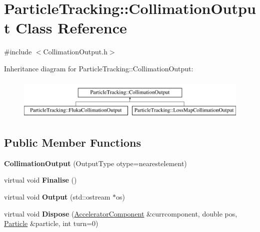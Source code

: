 \hypertarget{classParticleTracking_1_1CollimationOutput}{}\section{Particle\+Tracking\+:\+:Collimation\+Output Class Reference}
\label{classParticleTracking_1_1CollimationOutput}


{\ttfamily \#include $<$Collimation\+Output.\+h$>$}

Inheritance diagram for Particle\+Tracking\+:\+:Collimation\+Output\+:\begin{figure}[H]
\begin{center}
\leavevmode
\includegraphics[height=2.000000cm]{classParticleTracking_1_1CollimationOutput}
\end{center}
\end{figure}
\subsection*{Public Member Functions}
\begin{DoxyCompactItemize}
\item 
\mbox{\label{classParticleTracking_1_1CollimationOutput_a238ba78a99bc3b19b91b784860fcdc78}} 
{\bfseries Collimation\+Output} (Output\+Type otype=nearestelement)
\item 
\mbox{\label{classParticleTracking_1_1CollimationOutput_a7d6306b0c7bedc6a69637955f937c28c}} 
virtual void {\bfseries Finalise} ()
\item 
\mbox{\label{classParticleTracking_1_1CollimationOutput_abf969e669e6e55c32c76ea283ad299bf}} 
virtual void {\bfseries Output} (std\+::ostream $\ast$os)
\item 
\mbox{\label{classParticleTracking_1_1CollimationOutput_a3f6588b17f24390257331804bc2e4280}} 
virtual void {\bfseries Dispose} (\hyperlink{classAcceleratorComponent}{Accelerator\+Component} \&currcomponent, double pos, \hyperlink{classPSvector}{Particle} \&particle, int turn=0)
\end{DoxyCompactItemize}
